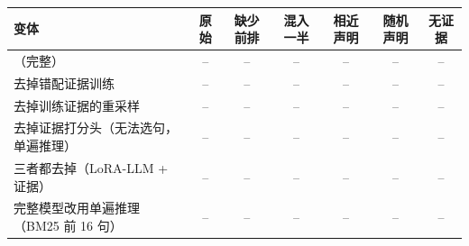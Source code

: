 \begin{tabular}{lcccccc}
\toprule
变体 & 原始 & 缺少前排 & 混入一半 & 相近声明 & 随机声明 & 无证据 \\
\midrule
\ours{}（完整） & -- & -- & -- & -- & -- & -- \\
去掉错配证据训练 & -- & -- & -- & -- & -- & -- \\
去掉训练证据的重采样 & -- & -- & -- & -- & -- & -- \\
去掉证据打分头（无法选句，单遍推理） & -- & -- & -- & -- & -- & -- \\
三者都去掉（LoRA-LLM + 证据） & -- & -- & -- & -- & -- & -- \\
\midrule
完整模型改用单遍推理（BM25 前 16 句） & -- & -- & -- & -- & -- & -- \\
\bottomrule
\end{tabular}
